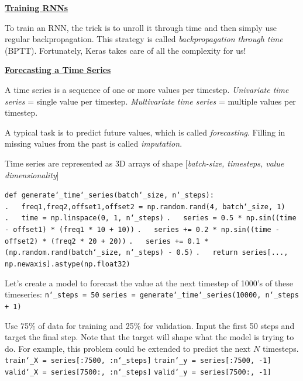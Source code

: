 \vspace{+4.0mm}
\textbf{\underline{Training RNNs}}

To train an RNN, the trick is to unroll it through time and then simply use regular backpropagation.
This strategy is called \textit{backpropagation through time} (BPTT).
Fortunately, Keras takes care of all the complexity for us!\newline

\textbf{\underline{Forecasting a Time Series}}

A time series is a sequence of one or more values per timestep.\newline
\textit{Univariate time series} = single value per timestep.\newline
\textit{Multivariate time series} = multiple values per timestep.

A typical task is to predict future values, which is called \textit{forecasting}.\newline
Filling in missing values from the past is called \textit{imputation}.

\newpage

Time series are represented as 3D arrays of shape [\textit{batch-size, timesteps, value dimensionality}]

\texttt{def generate\char`_time\char`_series(batch\char`_size, n\char`_steps):}\newline
\texttt{.~~~freq1,freq2,offset1,offset2 = np.random.rand(4, batch\char`_size, 1)}\newline
\texttt{.~~~time = np.linspace(0, 1, n\char`_steps)}\newline
\texttt{.~~~series = 0.5 * np.sin((time - offset1) * (freq1 * 10 + 10))}\newline
\texttt{.~~~series += 0.2 * np.sin((time - offset2) * (freq2 * 20 + 20))}\newline
\texttt{.~~~series += 0.1 * (np.random.rand(batch\char`_size, n\char`_steps) - 0.5)}\newline
\texttt{.~~~return series[..., np.newaxis].astype(np.float32)}\newline

Let's create a model to forecast the value at the next timestep of 1000's of these timeseries:\newline
\texttt{n\char`_steps = 50}\newline
\texttt{series = generate\char`_time\char`_series(10000, n\char`_steps + 1)}

Use 75\% of data for training and 25\% for validation.\newline
Input the first 50 steps and target the final step.
Note that the target will shape what the model is trying to do.
For example, this problem could be extended to predict the next $N$ timesteps.\newline
\texttt{train\char`_X = series[:7500, :n\char`_steps]}\newline
\texttt{train\char`_y = series[:7500, -1]}\newline
\texttt{valid\char`_X = series[7500:, :n\char`_steps]}\newline
\texttt{valid\char`_y = series[7500:, -1]}\newline\newline

